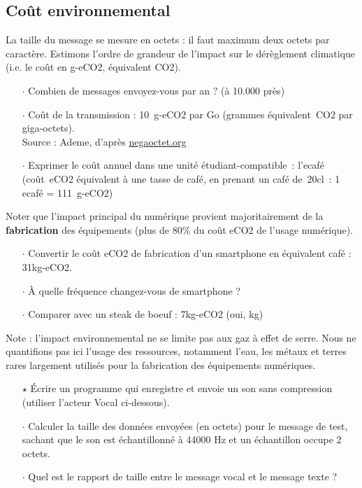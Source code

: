 

\subsection*{Coût environnemental}

La taille du message se mesure en octets : il faut maximum deux octets par caractère.
Estimons l'ordre de grandeur de l'impact sur le dérèglement climatique (i.e. le coût en g-eCO2, équivalent CO2).

\begin{itemize}[itemsep=0.2ex]
\item[$\cdot$] Combien de messages envoyez-vous par an ? (à 10.000 près)
\item[$\cdot$] Coût de la transmission : 10~g-eCO2 par Go (grammes équivalent~CO2 par giga-octets).\\
  {\small Source : Ademe, d'après \url{negaoctet.org}}
\item[$\cdot$] Exprimer le coût annuel dans une unité étudiant-compatible~: l'ecafé (coût~eCO2 équivalent à une tasse de café, en prenant un café de~20cl~: 1 ecafé = 111~g-eCO2)
\end{itemize}

Noter que l'impact principal du numérique provient majoritairement de la \textbf{fabrication} des équipements (plus de 80\% du coût eCO2 de l'usage numérique).

\begin{itemize}[itemsep=0.2ex]
\item[$\cdot$] Convertir le coût eCO2 de fabrication d'un smartphone en équivalent café : 31kg-eCO2.
\item[$\cdot$] À quelle fréquence changez-vous de smartphone ?
\item[$\cdot$] Comparer avec un steak de boeuf : 7kg-eCO2 (oui, kg) {\footnotesize \color{gray}{(à quelle fréquence mangez-vous de la viande ?)}}
\end{itemize}

\medskip

Note : l'impact environnemental ne se limite pas aux gaz à effet de serre. Nous ne quantifions pas ici l'usage des ressources, notamment l'eau, les métaux et terres rares largement utilisés pour la fabrication des équipements numériques.


\begin{itemize}
\item[$\star$] Écrire un programme qui enregistre et envoie un son sans compression (utiliser l'acteur Vocal ci-dessous).
\item[$\cdot$] Calculer la taille des données envoyées (en octets) pour le message de test, sachant que le son est échantillonné à 44000 Hz et un échantillon occupe 2 octets.
\item[$\cdot$] Quel est le rapport de taille entre le message vocal et le message texte ?
\end{itemize}

